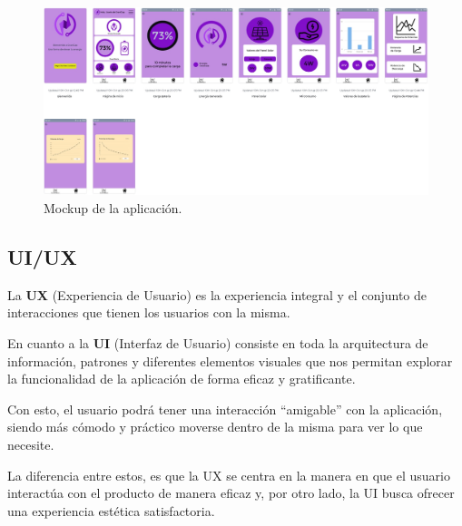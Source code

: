                 \begin{figure}[H]
                    \centering
                    \includegraphics[width=0.8\linewidth]{Imagenes/Aplicación/Mockup.jpg}
                    \caption{Mockup de la aplicación.}
                    \label{fig:a14}
                \end{figure}
                
            \subsection{UI/UX}
                La \textbf{UX} (Experiencia de Usuario) es la experiencia integral y el conjunto de interacciones que tienen los usuarios con la misma.\par
                En cuanto a la \textbf{UI} (Interfaz de Usuario) consiste en toda la arquitectura de información, patrones y diferentes elementos visuales que nos permitan explorar la funcionalidad de la aplicación de forma eficaz y gratificante.\par
                Con esto, el usuario podrá tener una interacción “amigable” con la aplicación, siendo más cómodo y práctico moverse dentro de la misma para ver lo que necesite.\par
                La diferencia entre estos, es que la UX se centra en la manera en que el usuario interactúa con el producto de manera eficaz y, por otro lado, la UI busca ofrecer una experiencia estética satisfactoria.\par

